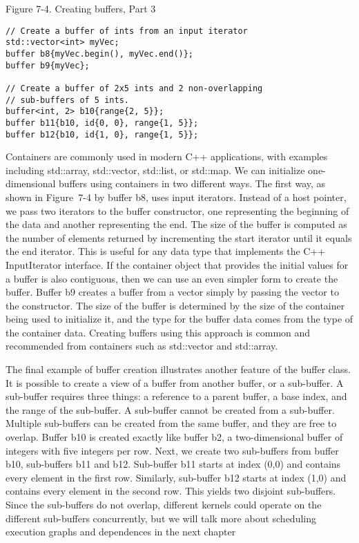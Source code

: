 \hspace*{\fill} \par %
Figure 7-4. Creating buffers, Part 3
\begin{lstlisting}[caption={}]
// Create a buffer of ints from an input iterator
std::vector<int> myVec;
buffer b8{myVec.begin(), myVec.end()};
buffer b9{myVec};

// Create a buffer of 2x5 ints and 2 non-overlapping 
// sub-buffers of 5 ints.
buffer<int, 2> b10{range{2, 5}};
buffer b11{b10, id{0, 0}, range{1, 5}};
buffer b12{b10, id{1, 0}, range{1, 5}};
\end{lstlisting}

Containers are commonly used in modern C++ applications, with examples including std::array, std::vector, std::list, or std::map. We can initialize one-dimensional buffers using containers in two different ways. The first way, as shown in Figure 7-4 by buffer b8, uses input iterators. Instead of a host pointer, we pass two iterators to the buffer constructor, one representing the beginning of the data and another representing the end. The size of the buffer is computed as the number of elements returned by incrementing the start iterator until it equals the end iterator. This is useful for any data type that implements the C++ InputIterator interface. If the container object that provides the initial values for a buffer is also contiguous, then we can use an even simpler form to create the buffer. Buffer b9 creates a buffer from a vector simply by passing the vector to the constructor. The size of the buffer is determined by the size of the container being used to initialize it, and the type for the buffer data comes from the type of the container data. Creating buffers using this approach is common and recommended from containers such as std::vector and std::array.\par

The final example of buffer creation illustrates another feature of the buffer class. It is possible to create a view of a buffer from another buffer, or a sub-buffer. A sub-buffer requires three things: a reference to a parent buffer, a base index, and the range of the sub-buffer. A sub-buffer cannot be created from a sub-buffer. Multiple sub-buffers can be created from the same buffer, and they are free to overlap. Buffer b10 is created exactly like buffer b2, a two-dimensional buffer of integers with five integers per row. Next, we create two sub-buffers from buffer b10, sub-buffers b11 and b12. Sub-buffer b11 starts at index (0,0) and contains every element in the first row. Similarly, sub-buffer b12 starts at index (1,0) and contains every element in the second row. This yields two disjoint sub-buffers. Since the sub-buffers do not overlap, different kernels could operate on the different sub-buffers concurrently, but we will talk more about scheduling execution graphs and dependences in the next chapter\par


